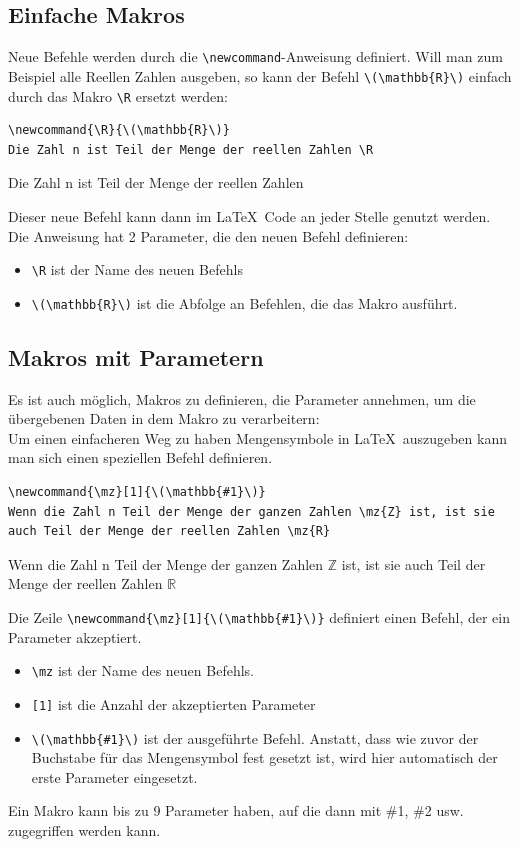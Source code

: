 \documentclass[ngerman,12pt,titlepage]{scrartcl}
\newenvironment{hlbox}{\begin{tcolorbox}[enhanced,colback=white,colframe=white,sharpish corners,fuzzy halo=0.5mm with lightgray]}{\end{tcolorbox}}
\begin{document}
\subsection{Einfache Makros}
\label{ssec:EinfacheMak}
Neue Befehle werden durch die \texttt{{\textbackslash}newcommand}-Anweisung definiert. Will man zum Beispiel alle Reellen Zahlen ausgeben, so kann der Befehl \lstinline|\(\mathbb{R}\)| einfach durch das Makro \lstinline|\R| ersetzt werden:
\begin{lstlisting}[caption = newcommand]
\newcommand{\R}{\(\mathbb{R}\)}
Die Zahl n ist Teil der Menge der reellen Zahlen \R 
\end{lstlisting}
\begin{hlbox}
Die Zahl n ist Teil der Menge der reellen Zahlen \R 
\end{hlbox}
\newpage

Dieser neue Befehl kann dann im \LaTeX \ Code an jeder Stelle genutzt werden. \\
Die Anweisung hat 2 Parameter, die den neuen Befehl definieren:
\begin{itemize}
\item[] \lstinline|\R| ist der Name des neuen Befehls
\item[] \lstinline|\(\mathbb{R}\)| ist die Abfolge an Befehlen, die das Makro ausführt.
\end{itemize}

\subsection{Makros mit Parametern}
\label{ssec:MakMPara}
\newcommand{\mz}[1]{\(\mathbb{#1}\)}
Es ist auch möglich, Makros zu definieren, die Parameter annehmen, um die übergebenen Daten in dem Makro zu verarbeitern: \\
Um einen einfacheren Weg zu haben Mengensymbole in \LaTeX \ auszugeben kann man sich einen speziellen Befehl definieren. \\
\begin{lstlisting}[caption = Mengenzeichen]
\newcommand{\mz}[1]{\(\mathbb{#1}\)}
Wenn die Zahl n Teil der Menge der ganzen Zahlen \mz{Z} ist, ist sie auch Teil der Menge der reellen Zahlen \mz{R}
\end{lstlisting}
\begin{hlbox}
Wenn die Zahl n Teil der Menge der ganzen Zahlen \mz{Z} ist, ist sie auch Teil der Menge der reellen Zahlen \mz{R}
\end{hlbox}
Die Zeile \lstinline|\newcommand{\mz}[1]{\(\mathbb{#1}\)}| definiert einen Befehl, der ein Parameter akzeptiert.
\begin{itemize}
\item[] \lstinline|\mz|  ist der Name des neuen Befehls.
\item[] \lstinline|[1]|  ist die Anzahl der akzeptierten Parameter
\item[] \lstinline|\(\mathbb{#1}\)|  ist der ausgeführte Befehl. Anstatt, dass wie zuvor der Buchstabe für das Mengensymbol fest gesetzt ist, wird hier automatisch der erste Parameter eingesetzt.
\end{itemize}
Ein Makro kann bis zu 9 Parameter haben, auf die dann mit \#1, \#2 usw. zugegriffen werden kann.
\end{document}
